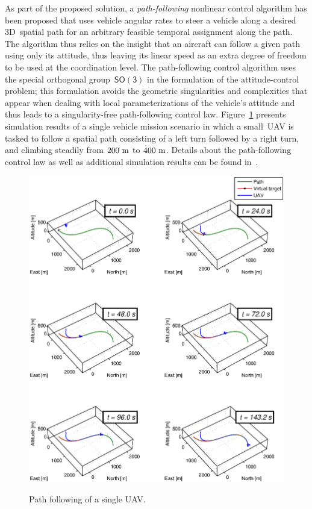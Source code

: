 \documentclass[letter,onecolumn,12pt]{aiaa-tc}
\newcommand{\1}{1_n}
\begin{document}


As part of the proposed solution, a \emph{path-following} nonlinear control algorithm has been proposed that uses vehicle angular rates to steer a vehicle along a desired 3D~spatial path for an arbitrary feasible temporal assignment along the path. The algorithm thus relies on the insight that an aircraft can follow a given path using only its attitude, thus leaving its linear speed as an extra degree of freedom to be used at the coordination level. The path-following control algorithm uses the special orthogonal group~$\mathsf{SO(3)}$ in the formulation of the attitude-control problem; this formulation avoids the geometric singularities and complexities that appear when dealing with local parameterizations of the vehicle's attitude and thus leads to a singularity-free path-following control law. Figure~\ref{fig:ScenPF_PFsequence} presents simulation results of a single vehicle mission scenario in which a small~UAV is tasked to follow a spatial path consisting of a left turn followed by a right turn, and climbing steadily from $200~{\rm m}$ to $400~{\rm m}$. Details about the path-following control law as well as additional simulation results can be found in~\cite{GNC11_PFSO3,XargayPhd}.


\begin{figure}[p]
    \centering
    \hspace*{-10mm}
    \includegraphics[width=\textwidth]{figures/CPF/Scen_pf3D.eps}\\[-5ex]
    \caption{Path following of a single UAV.}
    \label{fig:ScenPF_PFsequence}
\end{figure}
\end{document}
